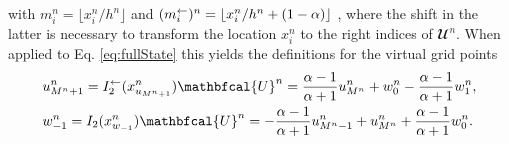 with $m_i^n = \lfloor x_i^n/h^n\rfloor$ and $(m_i^\leftarrow)^n = \lfloor x_i^n/ h^n+(1-\alpha) \rfloor$ , where the shift in the latter is necessary to transform the location $x_i^n$ to the right indices of $\mathbfcal{U}^n$.
When applied to Eq. \eqref{eq:fullState} this yields the definitions for the virtual grid points
\begin{subequations}\label{eq:connectionInterpol}
\begin{align}
        &u_{M^n+1}^n = I_2^\flip(x^n_{u_{M^n+1}})\mathbfcal{U}^n = \frac{\alpha - 1}{\alpha + 1}u_{M^n}^n + w_0^n - \frac{\alpha - 1}{\alpha + 1}w_1^n,
    \label{eq:calcUMP1}\\
        &w_{-1}^n = I_2(x^n_{w_{-1}})\mathbfcal{U}^n
        =-\frac{\alpha - 1}{\alpha + 1}u_{M^n-1}^n + u_{M^n}^n+ \frac{\alpha - 1}{\alpha + 1}w_{0}^n.\label{eq:calcWM1}
\end{align}
\end{subequations}

